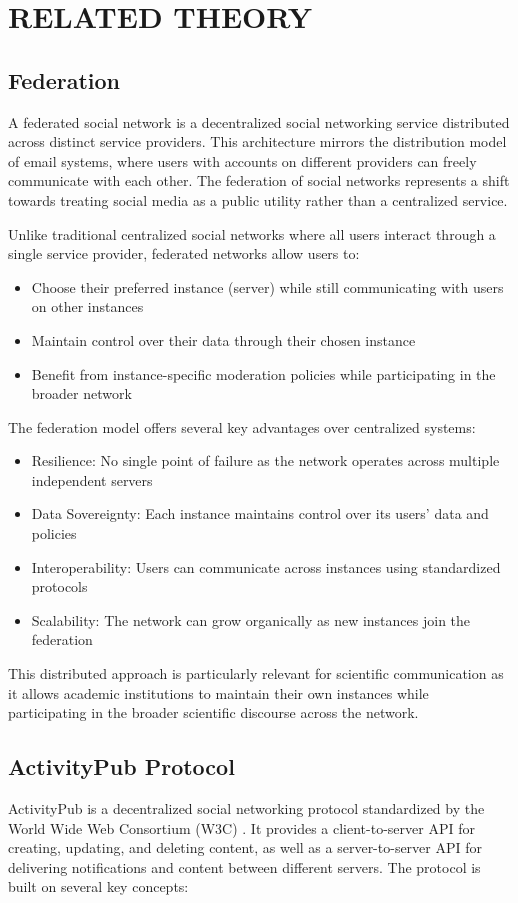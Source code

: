 \chapter{RELATED THEORY}
\section{Federation}
A federated social network is a decentralized social networking service distributed across distinct service providers. This architecture mirrors the distribution model of email systems, where users with accounts on different providers can freely communicate with each other. The federation of social networks represents a shift towards treating social media as a public utility rather than a centralized service.

Unlike traditional centralized social networks where all users interact through a single service provider, federated networks allow users to:
\begin{itemize}
    \item Choose their preferred instance (server) while still communicating with users on other instances
    \item Maintain control over their data through their chosen instance
    \item Benefit from instance-specific moderation policies while participating in the broader network
\end{itemize}

The federation model offers several key advantages over centralized systems:
\begin{itemize}
    \item Resilience: No single point of failure as the network operates across multiple independent servers
    \item Data Sovereignty: Each instance maintains control over its users' data and policies
    \item Interoperability: Users can communicate across instances using standardized protocols
    \item Scalability: The network can grow organically as new instances join the federation
\end{itemize}

This distributed approach is particularly relevant for scientific communication as it allows academic institutions to maintain their own instances while participating in the broader scientific discourse across the network.

\section{ActivityPub Protocol}
ActivityPub is a decentralized social networking protocol standardized by the World Wide Web Consortium (W3C) \cite{ActivityPub}. It provides a client-to-server API for creating, updating, and deleting content, as well as a server-to-server API for delivering notifications and content between different servers. The protocol is built on several key concepts:

